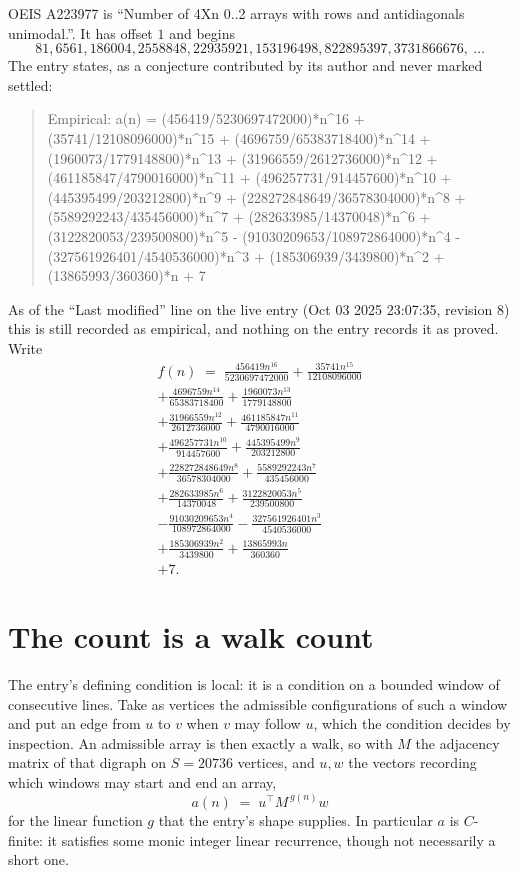 \documentclass[11pt,a4paper]{article}
\theoremstyle{plain}
\theoremstyle{definition}
\begin{document}
OEIS A223977 is ``Number of 4Xn 0..2 arrays with rows and antidiagonals unimodal.''. It has offset $1$ and begins
\[
81, 6561, 186004, 2558848, 22935921, 153196498, 822895397, 3731866676,\ \dots
\]
The entry states, as a conjecture contributed by its author and never marked settled:
\begin{quote}\raggedright\small
Empirical: a(n) = (456419/5230697472000)*n\^{}16 + (35741/12108096000)*n\^{}15 + (4696759/65383718400)*n\^{}14 + (1960073/1779148800)*n\^{}13 + (31966559/2612736000)*n\^{}12 + (461185847/4790016000)*n\^{}11 + (496257731/914457600)*n\^{}10 + (445395499/203212800)*n\^{}9 + (228272848649/36578304000)*n\^{}8 + (5589292243/435456000)*n\^{}7 + (282633985/14370048)*n\^{}6 + (3122820053/239500800)*n\^{}5 - (91030209653/108972864000)*n\^{}4 - (327561926401/4540536000)*n\^{}3 + (185306939/3439800)*n\^{}2 + (13865993/360360)*n + 7
\end{quote}
As of the ``Last modified'' line on the live entry (Oct 03 2025 23:07:35, revision 8) this is still
recorded as empirical, and nothing on the entry records it as proved. Write
\begin{multline*}
f(n)\;=\;\frac{456419 n^{16}}{5230697472000} + \frac{35741 n^{15}}{12108096000} \\
+ \frac{4696759 n^{14}}{65383718400} + \frac{1960073 n^{13}}{1779148800} \\
+ \frac{31966559 n^{12}}{2612736000} + \frac{461185847 n^{11}}{4790016000} \\
+ \frac{496257731 n^{10}}{914457600} + \frac{445395499 n^{9}}{203212800} \\
+ \frac{228272848649 n^{8}}{36578304000} + \frac{5589292243 n^{7}}{435456000} \\
+ \frac{282633985 n^{6}}{14370048} + \frac{3122820053 n^{5}}{239500800} \\
- \frac{91030209653 n^{4}}{108972864000} - \frac{327561926401 n^{3}}{4540536000} \\
+ \frac{185306939 n^{2}}{3439800} + \frac{13865993 n}{360360} \\
+ 7.
\end{multline*}

\section{The count is a walk count}

The entry's defining condition is local: it is a condition on a bounded window of consecutive lines. Take as vertices the
admissible configurations of such a window and put an edge from $u$ to $v$ when $v$ may
follow $u$, which the condition decides by inspection. An admissible array is then exactly a
walk, so with $M$ the adjacency matrix of that digraph on $S=20736$ vertices, and $u,w$ the
vectors recording which windows may start and end an array,
\[
a(n)\;=\;u^{\!\top}M^{\,g(n)}w
\]
for the linear function $g$ that the entry's shape supplies. In particular $a$ is
$C$-finite: it satisfies some monic integer linear recurrence, though not necessarily a short
one.
\end{document}

